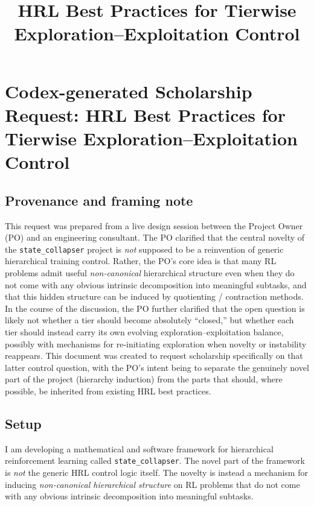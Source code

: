 \documentclass[11pt]{article}
\title{HRL Best Practices for Tierwise Exploration--Exploitation Control}
\author{}
\date{}
\begin{document}
\maketitle




\section*{Codex-generated Scholarship Request: HRL Best Practices for Tierwise Exploration--Exploitation Control}

\subsection*{Provenance and framing note}

This request was prepared from a live design session between the Project Owner (PO) and an engineering consultant. The PO clarified that the central novelty of the \texttt{state\_collapser} project is \emph{not} supposed to be a reinvention of generic hierarchical training control. Rather, the PO's core idea is that many RL problems admit useful \emph{non-canonical} hierarchical structure even when they do not come with any obvious intrinsic decomposition into meaningful subtasks, and that this hidden structure can be induced by quotienting / contraction methods. In the course of the discussion, the PO further clarified that the open question is likely not whether a tier should become absolutely ``closed,'' but whether each tier should instead carry its own evolving exploration--exploitation balance, possibly with mechanisms for re-initiating exploration when novelty or instability reappears. This document was created to request scholarship specifically on that latter control question, with the PO's intent being to separate the genuinely novel part of the project (hierarchy induction) from the parts that should, where possible, be inherited from existing HRL best practices.

\subsection*{Setup}

I am developing a mathematical and software framework for hierarchical reinforcement learning called \texttt{state\_collapser}. The novel part of the framework is \emph{not} the generic HRL control logic itself. The novelty is instead a mechanism for inducing \emph{non-canonical hierarchical structure} on RL problems that do not come with any obvious intrinsic decomposition into meaningful subtasks.
\end{document}
